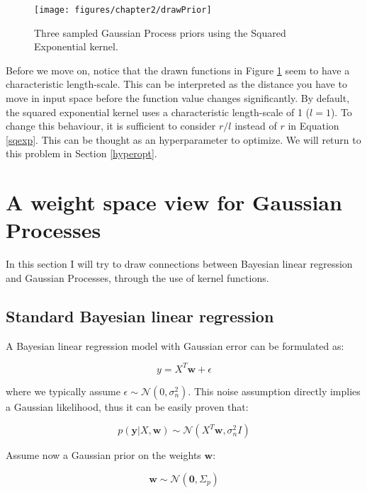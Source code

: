 \documentclass[10pt,a4paper,twoside]{book}
\begin{document}
\begin{figure}
\caption{Three sampled Gaussian Process priors using the Squared Exponential kernel.}
\label{fig:drawPrior}
\texttt{[image: figures/chapter2/drawPrior]}
\end{figure}

Before we move on, notice that the drawn functions in Figure \ref{fig:drawPrior} seem to have a characteristic length-scale. This can be interpreted as the distance you have to move in input space before the function value changes significantly. By default, the squared exponential kernel uses a characteristic length-scale of 1 ($l = 1$). To change this behaviour, it is sufficient to consider $r/l$ instead of $r$ in Equation \ref{sqexp}. This can be thought as an hyperparameter to optimize. We will return to this problem in Section \ref{hyperopt}.

\section{A weight space view for Gaussian Processes}

In this section I will try to draw connections between Bayesian linear regression \cite{Bolstad2007} and  Gaussian Processes, through the use of kernel functions. 

\subsection{Standard Bayesian linear regression}

A Bayesian linear regression model with Gaussian error can be formulated as:

\begin{equation}
\label{linearmodel}
y = X^T \boldsymbol{w} + \epsilon
\end{equation} 

where we typically assume $\epsilon \sim \mathcal{N}(0, \sigma_n^2)$. This noise assumption directly implies a Gaussian likelihood, thus it can be easily proven that:

\begin{equation}
p(\boldsymbol{y}|X, \boldsymbol{w}) \sim \mathcal{N} (X^T\boldsymbol{w}, \sigma_n^2 I)
\end{equation}

Assume now a Gaussian prior on the weights $\boldsymbol{w}$:

\begin{equation}
\label{wprior}
\boldsymbol{w} \sim \mathcal{N}(\boldsymbol{0}, \Sigma_p)
\end{equation}
\end{document}
